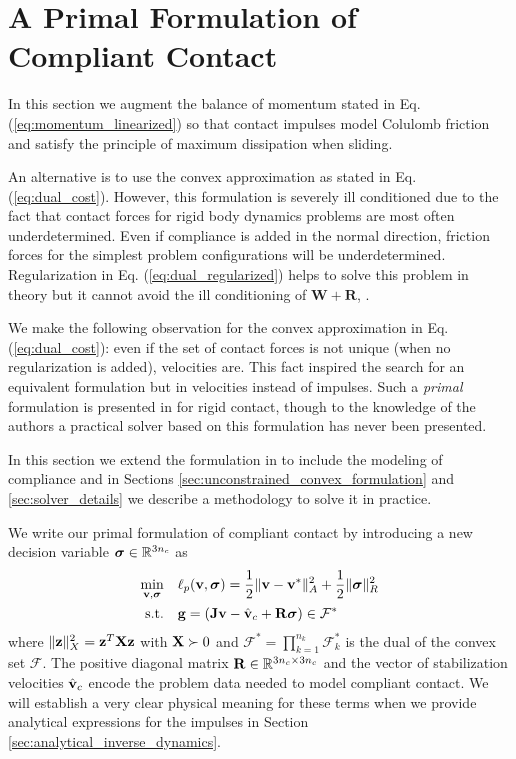 
\section{A Primal Formulation of Compliant Contact}
\label{sec:primal_formulation}

In this section we augment the balance of momentum stated in Eq.
(\ref{eq:momentum_linearized}) so that contact impulses model Colulomb friction
and satisfy the principle of maximum dissipation when sliding. 

An alternative is to use the convex approximation as stated in Eq.
(\ref{eq:dual_cost}). However, this formulation is severely ill conditioned due
to the fact that contact forces for rigid body dynamics problems are most often
underdetermined. Even if compliance is added in the normal direction, friction
forces for the simplest problem configurations will be underdetermined.
Regularization in Eq. (\ref{eq:dual_regularized}) helps to solve this problem in
theory but it cannot avoid the ill conditioning of $\mathbf{W}+\mathbf{R}$,
\cite{bib:enzenhofer2019efficient}.

We make the following observation for the convex approximation in Eq.
(\ref{eq:dual_cost}): even if the set of contact forces is not unique (when no
regularization is added), velocities are. This fact inspired the search
for an equivalent formulation but in velocities instead of impulses. Such a
\textit{primal} formulation is presented in \cite{bib:mazhar2014} for rigid
contact, though to the knowledge of the authors a practical solver based on this
formulation has never been presented.

In this section we extend the formulation in \cite{bib:mazhar2014} to include
the modeling of compliance and in Sections
\ref{sec:unconstrained_convex_formulation} and \ref{sec:solver_details} we
describe a methodology to solve it in practice.

We write our primal formulation of compliant contact by introducing a new
decision variable ${\bm{\sigma}}\in\mathbb{R}^{3n_c}$ as
\begin{equation}
	\begin{aligned}
	\min_{\mf{v},\bsigma} \quad & \ell_p(\mf{v},\bsigma) =
	\frac{1}{2}\Vert\mf{v}-\mf{v}^*\Vert_{A}^2 +
	\frac{1}{2} \Vert\bsigma\Vert_{R}^2\\
	\textrm{s.t.} \quad & \mf{g} = (\mf{J}\mf{v}-\hat{\mf{v}}_c + \mf{R}\bsigma) \in \mathcal{F}^*\\
	\end{aligned}
	\label{eq:primal_regularized}
\end{equation}
where $\Vert{\mathbf{z}}\Vert_X^2={\mathbf{z}}^T{\mathbf{X}}{\mathbf{z}}$ with ${\mathbf{X}}\succ 0$
and $\mathcal{F^*}=\prod_{k=1}^{n_k}\mathcal{F}^*_k$ is the dual of the convex
set $\mathcal{F}$. The positive diagonal matrix ${\mathbf{R}}\in\mathbb{R}^{3n_c\times
3n_c}$ and the vector of stabilization velocities $\hat{{\mathbf{v}}}_c$ encode the
problem data needed to model compliant contact. We will establish a very clear
physical meaning for these terms when we provide analytical expressions for the
impulses in Section \ref{sec:analytical_inverse_dynamics}.

